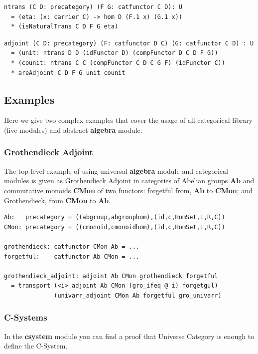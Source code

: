 \documentclass{article}
\begin{document}
\begin{lstlisting}[mathescape=true]
ntrans (C D: precategory) (F G: catfunctor C D): U
  = (eta: (x: carrier C) -> hom D (F.1 x) (G.1 x))
  * (isNaturalTrans C D F G eta)
\end{lstlisting}

\begin{lstlisting}[mathescape=true]
adjoint (C D: precategory) (F: catfunctor D C) (G: catfunctor C D) : U
  = (unit: ntrans D D (idFunctor D) (compFunctor D C D F G))
  * (counit: ntrans C C (compFunctor C D C G F) (idFunctor C))
  * areAdjoint C D F G unit counit
\end{lstlisting}

\subsection{Examples}

Here we give two complex examples that cover the usage of all categorical library (five modules)
and abstract {\bf algebra} module.

\subsubsection*{Grothendieck Adjoint}

The top level example of using universal {\bf algebra} module and categorical modules
is given as Grothendieck Adjoint in categories of Abelian groups {\bf Ab} and
commutative monoids {\bf CMon} of two functors: forgetful from, {\bf Ab} to {\bf CMon}; and
Grothendieck, from {\bf CMon} to {\bf Ab}.

\begin{lstlisting}[mathescape=true]
Ab:   precategory = ((abgroup,abgrouphom),(id,c,HomSet,L,R,C))
CMon: precategory = ((cmonoid,cmonoidhom),(id,c,HomSet,L,R,C))

grothendieck: catfunctor CMon Ab = ...
forgetful:    catfunctor Ab CMon = ...

grothendieck_adjoint: adjoint Ab CMon grothendieck forgetful
  = transport (<i> adjoint Ab CMon (gro_ifeq @ i) forgetgul)
              (univarr_adjoint CMon Ab forgetful gro_univarr)
\end{lstlisting}

\subsubsection*{C-Systems}

In the {\bf csystem} module you can find a proof that
Universe Category is enough to define the C-System.
\end{document}
